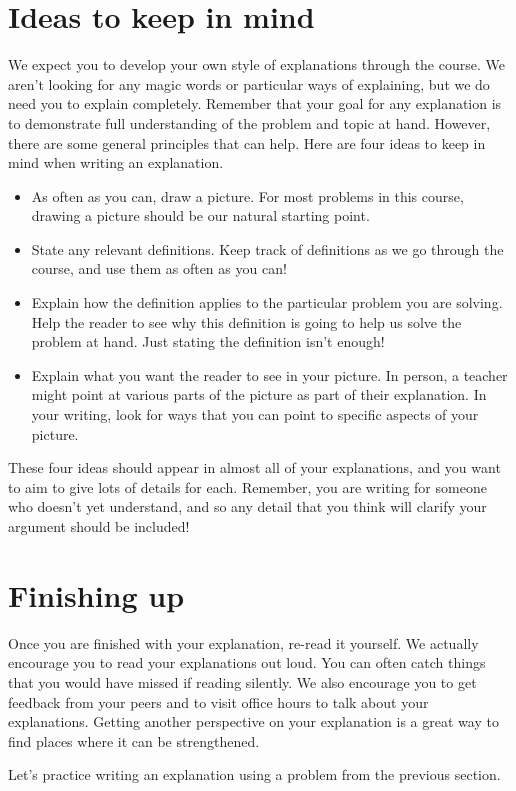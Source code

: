 \documentclass[noauthor,nooutcomes]{ximera}
\begin{document}
\section{Ideas to keep in mind}
We expect you to develop your own style of explanations through the course. We aren't looking for any magic words or particular ways of explaining, but we do need you to explain completely. Remember that your goal for any explanation is to demonstrate full understanding of the problem and topic at hand. However, there are some general principles that can help. Here are four ideas to keep in mind when writing an explanation.
\begin{itemize}
	\item As often as you can, draw a picture. For most problems in this course, drawing a picture should be our natural starting point.
	\item State any relevant definitions. Keep track of definitions as we go through the course, and use them as often as you can!
	\item Explain how the definition applies to the particular problem you are solving. Help the reader to see why this definition is going to help us solve the problem at hand. Just stating the definition isn't enough!
	\item Explain what you want the reader to see in your picture. In person, a teacher might point at various parts of the picture as part of their explanation. In your writing, look for ways that you can point to specific aspects of your picture.
\end{itemize}
These four ideas should appear in almost all of your explanations, and you want to aim to give lots of details for each. Remember, you are writing for someone who doesn't yet understand, and so any detail that you think will clarify your argument should be included!

\section{Finishing up}
Once you are finished with your explanation, re-read it yourself. We actually encourage you to read your explanations out loud. You can often catch things that you would have missed if reading silently. We also encourage you to get feedback from your peers and to visit office hours to talk about your explanations. Getting another perspective on your explanation is a great way to find places where it can be strengthened.


Let's practice writing an explanation using a problem from the previous section.
\end{document}
